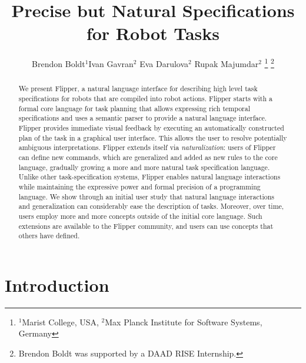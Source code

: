\documentclass[letterpaper, 10 pt, conference]{ieeeconf}  %
\title{\LARGE \bf Precise but Natural Specifications for Robot Tasks
}
\author{Brendon Boldt$^1$\quad Ivan Gavran$^2$ \quad Eva Darulova$^2$ \quad Rupak Majumdar$^2$%
\thanks{
$^1$Marist College, USA,
$^2$Max Planck Institute for Software Systems, Germany
}%
\thanks{Brendon Boldt was supported by a DAAD RISE Internship.}
}
\newcommand{\tool}{Flipper\xspace}
\begin{document}
\maketitle
\thispagestyle{empty}
\pagestyle{empty}


\begin{abstract}
We present \tool, a
natural language interface for describing
high level task specifications for robots
that are compiled into robot actions.
\tool starts with a formal core language for task planning that allows
expressing rich temporal specifications and
uses a semantic parser to provide a natural language interface.
\tool provides immediate visual feedback by executing an automatically
constructed plan of the task in a graphical user interface.
This allows the user to resolve potentially ambiguous interpretations.
\tool extends itself via \emph{naturalization}: users of \tool can
define new commands, which are generalized and added as new rules to the core language,
gradually growing a more and more natural task specification language.
%
Unlike other task-specification systems, \tool enables natural language
interactions while maintaining the expressive power and formal precision of a programming language.
We show through an initial user study that natural language interactions and generalization
can considerably ease the description of tasks.
Moreover, over time, users employ more and more concepts outside of the initial core language.
Such extensions are available to the \tool community, and users can use concepts that others have defined.

\end{abstract}



\section{Introduction}
\end{document}
